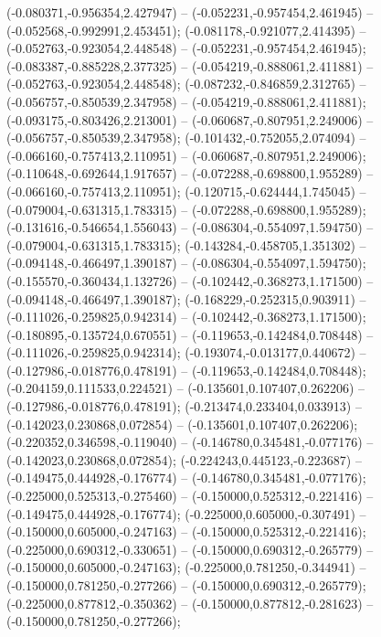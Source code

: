  (-0.080371,-0.956354,2.427947) -- (-0.052231,-0.957454,2.461945) -- (-0.052568,-0.992991,2.453451);
 (-0.081178,-0.921077,2.414395) -- (-0.052763,-0.923054,2.448548) -- (-0.052231,-0.957454,2.461945);
 (-0.083387,-0.885228,2.377325) -- (-0.054219,-0.888061,2.411881) -- (-0.052763,-0.923054,2.448548);
 (-0.087232,-0.846859,2.312765) -- (-0.056757,-0.850539,2.347958) -- (-0.054219,-0.888061,2.411881);
 (-0.093175,-0.803426,2.213001) -- (-0.060687,-0.807951,2.249006) -- (-0.056757,-0.850539,2.347958);
 (-0.101432,-0.752055,2.074094) -- (-0.066160,-0.757413,2.110951) -- (-0.060687,-0.807951,2.249006);
 (-0.110648,-0.692644,1.917657) -- (-0.072288,-0.698800,1.955289) -- (-0.066160,-0.757413,2.110951);
 (-0.120715,-0.624444,1.745045) -- (-0.079004,-0.631315,1.783315) -- (-0.072288,-0.698800,1.955289);
 (-0.131616,-0.546654,1.556043) -- (-0.086304,-0.554097,1.594750) -- (-0.079004,-0.631315,1.783315);
 (-0.143284,-0.458705,1.351302) -- (-0.094148,-0.466497,1.390187) -- (-0.086304,-0.554097,1.594750);
 (-0.155570,-0.360434,1.132726) -- (-0.102442,-0.368273,1.171500) -- (-0.094148,-0.466497,1.390187);
 (-0.168229,-0.252315,0.903911) -- (-0.111026,-0.259825,0.942314) -- (-0.102442,-0.368273,1.171500);
 (-0.180895,-0.135724,0.670551) -- (-0.119653,-0.142484,0.708448) -- (-0.111026,-0.259825,0.942314);
 (-0.193074,-0.013177,0.440672) -- (-0.127986,-0.018776,0.478191) -- (-0.119653,-0.142484,0.708448);
 (-0.204159,0.111533,0.224521) -- (-0.135601,0.107407,0.262206) -- (-0.127986,-0.018776,0.478191);
 (-0.213474,0.233404,0.033913) -- (-0.142023,0.230868,0.072854) -- (-0.135601,0.107407,0.262206);
 (-0.220352,0.346598,-0.119040) -- (-0.146780,0.345481,-0.077176) -- (-0.142023,0.230868,0.072854);
 (-0.224243,0.445123,-0.223687) -- (-0.149475,0.444928,-0.176774) -- (-0.146780,0.345481,-0.077176);
 (-0.225000,0.525313,-0.275460) -- (-0.150000,0.525312,-0.221416) -- (-0.149475,0.444928,-0.176774);
 (-0.225000,0.605000,-0.307491) -- (-0.150000,0.605000,-0.247163) -- (-0.150000,0.525312,-0.221416);
 (-0.225000,0.690312,-0.330651) -- (-0.150000,0.690312,-0.265779) -- (-0.150000,0.605000,-0.247163);
 (-0.225000,0.781250,-0.344941) -- (-0.150000,0.781250,-0.277266) -- (-0.150000,0.690312,-0.265779);
 (-0.225000,0.877812,-0.350362) -- (-0.150000,0.877812,-0.281623) -- (-0.150000,0.781250,-0.277266);
